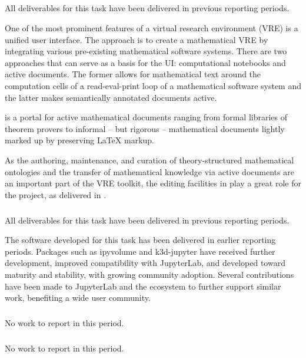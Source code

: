 \subparagraph{}
\label{UI@mathhub}

All deliverables for this task have been delivered in previous reporting periods.


One of the most prominent features of a virtual research environment (VRE) is a unified user interface. The \ODK approach is to create a mathematical VRE by integrating various pre-existing mathematical software systems. There are two approaches that can serve as a basis for the \ODK UI: computational notebooks and active documents. The former allows for mathematical text around the computation cells of a read-eval-print loop of a mathematical software system and the latter makes semantically annotated documents active.

\MathHub is a portal for active mathematical documents ranging from formal libraries of theorem provers to informal – but rigorous – mathematical documents lightly marked up by preserving LaTeX markup.

As the authoring, maintenance, and curation of theory-structured mathematical ontologies and the transfer of mathematical knowledge via active documents are an important part of the \ODK VRE toolkit, the editing facilities in \MathHub play a great role for the project,
as delivered in .

\subparagraph{}
\label{UI@vis3d}

All deliverables for this task have been delivered in previous reporting periods.

The software developed for this task has been delivered in earlier reporting periods.
Packages such as ipyvolume and k3d-jupyter have received further development,
improved compatibility with JupyterLab,
and developed toward maturity and stability,
with growing community adoption.
Several contributions have been made to JupyterLab and
the \Jupyter ecosystem to further support similar work,
benefiting a wide user community.

\subparagraph{} %
\label{UI@cfd-vis}

No work to report in this period.


\subparagraph{} %

No work to report in this period.

\subparagraph{} %
\label{UI@oommf-py-ipython-attributes}

